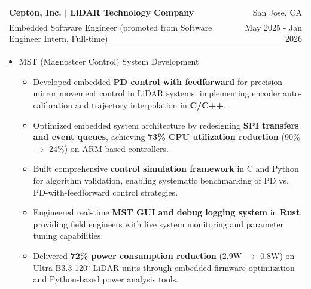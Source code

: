 \documentclass[a4paper,20pt]{article}
\makeatletter
\newcommand{\resumeResearchSubheadingShort}[4]{
  \vspace{5pt}\item
    \begin{tabular*} {0.98\textwidth} {@{\hspace{-0.5em}}l@{\extracolsep{\fill}}r@{}}
      \textbf{#1} & {#2}\null \\
      {#3} & {#4}
    \end{tabular*}
  \vspace{-6pt}
}
\newcommand{\resumeResearchItemListStart}{
  \begin{itemize} [leftmargin=*]
}
\newcommand{\resumeResearchItemListEnd}{
  \end{itemize}
  \vspace{-5pt}
}
\newcommand{\resumeResearchItem}[1]{
  \item{
    {#1 \vspace{-1pt}}
  }
}
\newcommand{\resumeResearchMidItemListStart}{
  \begin{itemize} [leftmargin=*]
}
\newcommand{\resumeResearchMidItemListEnd}{
  \end{itemize}
  \vspace{-5pt}
}
\newcommand{\resumeResearchMidItem}[2]{
  \item{
    \textbf{#1}
    {#2 \vspace{-2pt}}
  }
}
\makeatother
\begin{document}
\resumeResearchSubheadingShort
{Cepton, Inc. \textnormal{\small{$|$ LiDAR Technology Company}}} {San Jose, CA}
{Embedded Software Engineer (promoted from Software Engineer Intern, Full-time)} {May 2025 - Jan 2026}
\resumeResearchMidItemListStart
\resumeResearchMidItem{}
{MST (Magnosteer Control) System Development}
{
  \resumeResearchItemListStart
  \resumeResearchItem{}
  {Developed embedded \textbf{PD control with feedforward} for precision mirror movement control in LiDAR systems, implementing encoder auto-calibration and trajectory interpolation in \textbf{C/C++}.}
  \resumeResearchItem{}
  {Optimized embedded system architecture by redesigning \textbf{SPI transfers and event queues}, achieving \textbf{73\% CPU utilization reduction} (90\% $\rightarrow$ 24\%) on ARM-based controllers.}
  \resumeResearchItem{}
  {Built comprehensive \textbf{control simulation framework} in C and Python for algorithm validation, enabling systematic benchmarking of PD vs. PD-with-feedforward control strategies.}
  \resumeResearchItem{}
  {Engineered real-time \textbf{MST GUI and debug logging system} in \textbf{Rust}, providing field engineers with live system monitoring and parameter tuning capabilities.}
  \resumeResearchItem{}
  {Delivered \textbf{72\% power consumption reduction} (2.9W $\rightarrow$ 0.8W) on Ultra B3.3 120$^\circ$ LiDAR units through embedded firmware optimization and Python-based power analysis tools.}
  \resumeResearchItemListEnd
}
\resumeResearchMidItemListEnd
\end{document}
